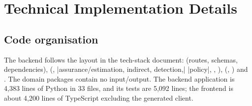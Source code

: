 \section{Technical Implementation Details}\label{sec:technical-implementation-details}
\subsection{Code organisation}\label{sec:code-organisation}
The backend follows the layout in the tech-stack document:  (routes, schemas, dependencies),  (, \code|assurance/{estimation, indirect, detection,| \code|policy}|, , ),  (, ) and . The domain packages contain no input/output. The backend application is 4,383 lines of Python in 33 files, and its tests are 5,092 lines; the frontend is about 4,200 lines of TypeScript excluding the generated client.


